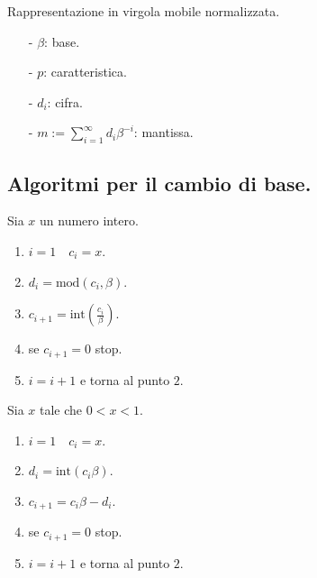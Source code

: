\begin{defi}
Rappresentazione in virgola mobile normalizzata.
\begin{itemize}
\item[-]$\beta$: base.
\item[-]$p$: caratteristica.
\item[-]$d_i$: cifra.
\item[-]$m := \sum_{i = 1}^{\infty}d_i\beta^{-i}$: mantissa.
\end{itemize}
\end{defi}

\subsection{Algoritmi per il cambio di base.}
Sia $x$ un numero intero.
\begin{enumerate}
\item $i = 1 \quad c_i = x$.
\item $d_i = \mathrm{mod}(c_i, \beta)$.
\item $c_{i+1} = \mathrm{int}(\frac{c_i}{\beta})$.
\item se $c_{i+1} = 0$ stop.
\item $i = i+1$ e torna al punto $2$.
\end{enumerate}
Sia $x$ tale che $0 < x < 1$.
\begin{enumerate}
\item $i = 1 \quad c_i = x$.
\item $d_i = \mathrm{int}(c_i \beta)$.
\item $c_{i+1} = c_i\beta - d_i$.
\item se $c_{i+1} = 0$ stop.
\item $i = i+1$ e torna al punto $2$.
\end{enumerate}

